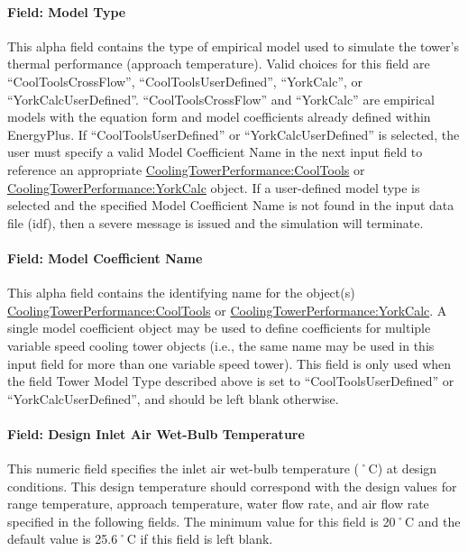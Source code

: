 \paragraph{Field: Model Type}\label{field-model-type}

This alpha field contains the type of empirical model used to simulate the tower's thermal performance (approach temperature). Valid choices for this field are ``CoolToolsCrossFlow'', ``CoolToolsUserDefined'', ``YorkCalc'', or ``YorkCalcUserDefined''. ``CoolToolsCrossFlow'' and ``YorkCalc'' are empirical models with the equation form and model coefficients already defined within EnergyPlus. If ``CoolToolsUserDefined'' or ``YorkCalcUserDefined'' is selected, the user must specify a valid Model Coefficient Name in the next input field to reference an appropriate \hyperref[coolingtowerperformancecooltools]{CoolingTowerPerformance:CoolTools} or \hyperref[coolingtowerperformanceyorkcalc]{CoolingTowerPerformance:YorkCalc} object. If a user-defined model type is selected and the specified Model Coefficient Name is not found in the input data file (idf), then a severe message is issued and the simulation will terminate.

\paragraph{Field: Model Coefficient Name}\label{field-model-coefficient-name}

This alpha field contains the identifying name for the object(s) \hyperref[coolingtowerperformancecooltools]{CoolingTowerPerformance:CoolTools} or \hyperref[coolingtowerperformanceyorkcalc]{CoolingTowerPerformance:YorkCalc}. A single model coefficient object may be used to define coefficients for multiple variable speed cooling tower objects (i.e., the same name may be used in this input field for more than one variable speed tower). This field is only used when the field Tower Model Type described above is set to ``CoolToolsUserDefined'' or ``YorkCalcUserDefined'', and should be left blank otherwise.

\paragraph{Field: Design Inlet Air Wet-Bulb Temperature}\label{field-design-inlet-air-wet-bulb-temperature}

This numeric field specifies the inlet air wet-bulb temperature (˚C) at design conditions. This design temperature should correspond with the design values for range temperature, approach temperature, water flow rate, and air flow rate specified in the following fields. The minimum value for this field is 20˚C and the default value is 25.6˚C if this field is left blank.

